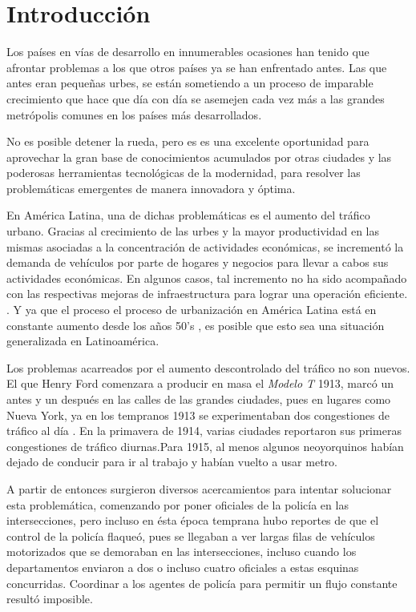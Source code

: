 
\chapter{Introducción} %
\graphicspath{{./../imagenes/}}
\linespread{1.3}
Los países en vías de desarrollo en innumerables ocasiones han tenido
que afrontar problemas a los que otros países ya se han enfrentado
antes. Las que antes eran pequeñas urbes, se están sometiendo a un
proceso de imparable crecimiento que hace que día con día se asemejen
cada vez más a las grandes metrópolis comunes en los países más
desarrollados.

No es posible detener la rueda, pero es es una excelente oportunidad
para aprovechar la gran base de conocimientos acumulados por otras
ciudades y las poderosas herramientas tecnológicas de la modernidad,
para resolver las problemáticas emergentes de manera innovadora y
óptima.

En América Latina, una de dichas problemáticas es el aumento del tráfico
urbano. Gracias al crecimiento de las urbes y la mayor productividad en
las mismas asociadas a la concentración de actividades económicas, se
incrementó la demanda de vehículos por parte de hogares y negocios para
llevar a cabos sus actividades económicas. En algunos casos, tal
incremento no ha sido acompañado con las respectivas mejoras de
infraestructura para lograr una operación eficiente.
\parencite[1]{Medina-Durango2011}. Y ya que el proceso el proceso de
urbanización en América Latina está en constante aumento desde los años
50's \parencite[27]{PdaCunha2009}, es posible que esto sea una situación
generalizada en Latinoamérica.

Los problemas acarreados por el aumento descontrolado del tráfico no son
nuevos. El que Henry Ford comenzara a producir en masa el \emph{Modelo
T} 1913, marcó un antes y un después en las calles de las grandes
ciudades, pues en lugares como Nueva York, ya en los tempranos 1913 se
experimentaban dos congestiones de tráfico al día
\textcite[p.380]{McShane1999}. En la primavera de 1914, varias ciudades
reportaron sus primeras congestiones de tráfico diurnas.Para 1915, al
menos algunos neoyorquinos habían dejado de conducir para ir al trabajo
y habían vuelto a usar metro. \textcite[p.380]{McShane1999}

A partir de entonces surgieron diversos acercamientos para intentar
solucionar esta problemática, comenzando por poner oficiales de la
policía en las intersecciones, pero incluso en ésta época temprana hubo
reportes de que el control de la policía flaqueó, pues se llegaban a ver
largas filas de vehículos motorizados que se demoraban en las
intersecciones, incluso cuando los departamentos enviaron a dos o
incluso cuatro oficiales a estas esquinas concurridas. Coordinar a los
agentes de policía para permitir un flujo constante resultó imposible.
\textcite[p. 382]{McShane1999}

